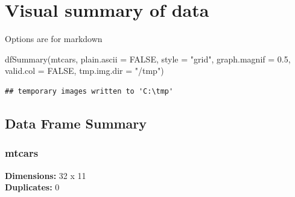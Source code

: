 \documentclass[
]{book}
\newenvironment{Shaded}{\begin{snugshade}}{\end{snugshade}}
\newcommand{\AttributeTok}[1]{\textcolor[rgb]{0.77,0.63,0.00}{#1}}
\newcommand{\ConstantTok}[1]{\textcolor[rgb]{0.00,0.00,0.00}{#1}}
\newcommand{\FloatTok}[1]{\textcolor[rgb]{0.00,0.00,0.81}{#1}}
\newcommand{\FunctionTok}[1]{\textcolor[rgb]{0.00,0.00,0.00}{#1}}
\newcommand{\NormalTok}[1]{#1}
\newcommand{\StringTok}[1]{\textcolor[rgb]{0.31,0.60,0.02}{#1}}
\begin{document}
\hypertarget{visual-summary-of-data}{%
\section{Visual summary of data}\label{visual-summary-of-data}}

Options are for markdown

\begin{Shaded}
\begin{Highlighting}[]
\FunctionTok{dfSummary}\NormalTok{(mtcars, }\AttributeTok{plain.ascii =} \ConstantTok{FALSE}\NormalTok{, }\AttributeTok{style =} \StringTok{"grid"}\NormalTok{, }
          \AttributeTok{graph.magnif =} \FloatTok{0.5}\NormalTok{, }\AttributeTok{valid.col =} \ConstantTok{FALSE}\NormalTok{, }\AttributeTok{tmp.img.dir =} \StringTok{"/tmp"}\NormalTok{)}
\end{Highlighting}
\end{Shaded}

\begin{verbatim}
## temporary images written to 'C:\tmp'
\end{verbatim}

\hypertarget{data-frame-summary}{%
\subsection{Data Frame Summary}\label{data-frame-summary}}

\hypertarget{mtcars}{%
\subsubsection{mtcars}\label{mtcars}}

\textbf{Dimensions:} 32 x 11\\
\textbf{Duplicates:} 0
\end{document}
